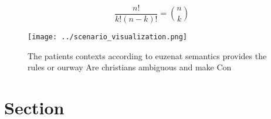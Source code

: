 \documentclass[a4paper]{article}
\begin{document}
\[ \frac{n!}{k!(n-k)!} = \binom{n}{k} \]

\begin{figure}
\centering
\texttt{[image: ../scenario\_visualization.png]}
\caption{The patients contexts according to euzenat semantics provides the rules or ourway Are christians ambiguous and make Con
}
\end{figure}
 
\section{Section}
\end{document}
